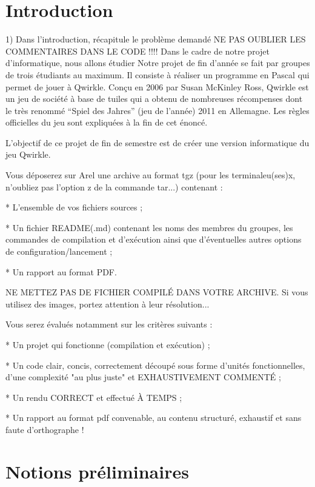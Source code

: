 
\newpage
	\section*{Introduction}
	1) Dans l'introduction, récapitule le problème demandé
	NE PAS OUBLIER LES COMMENTAIRES DANS LE CODE !!!!
Dans le cadre de notre projet d'informatique, nous allons étudier 
Notre projet de fin d'année se fait par groupes de trois étudiants au maximum.  Il  consiste  à  réaliser  un  programme en  Pascal  qui  permet  de  jouer à Qwirkle. Conçu en 2006 par Susan McKinley Ross, Qwirkle est un jeu de société à base de tuiles qui a  obtenu de  nombreuses récompenses  dont le  très renommé “Spiel des Jahres”  (jeu  de  l'année) 2011 en Allemagne. Les règles officielles du jeu sont expliquées à la fin de cet énoncé.


L'objectif de ce projet de fin de semestre est de créer une version informatique du jeu Qwirkle.

Vous déposerez sur Arel une archive au format tgz (pour les terminaleu(ses)x, n'oubliez pas l'option z de la commande tar...) contenant : 

     * L'ensemble de vos fichiers sources ;

     * Un fichier README(.md) contenant les noms des membres du groupes, les commandes de compilation et d'exécution ainsi que d'éventuelles autres options de configuration/lancement ;

     * Un rapport au format PDF.

NE METTEZ PAS DE FICHIER COMPILÉ DANS VOTRE ARCHIVE. Si vous utilisez des images, portez attention à leur résolution...

Vous serez évalués notamment sur les critères suivants :

     * Un projet qui fonctionne (compilation et exécution) ;

     * Un code clair, concis, correctement découpé sous forme d'unités fonctionnelles, d'une complexité "au plus juste" et EXHAUSTIVEMENT COMMENTÉ ;

     * Un rendu CORRECT et effectué À TEMPS ;

     * Un rapport au format pdf convenable, au contenu structuré, exhaustif et sans faute d'orthographe !


\newpage
\section{Notions préliminaires}

